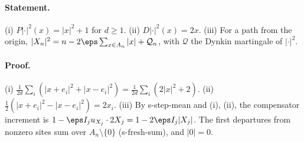 \paragraph{Statement.} (i) $P|\cdot|^2(x)=|x|^2+1$ for $d\geq1$. (ii) $D|\cdot|^2(x)=2x$. (iii) For a path from the origin,
$|X_n|^2=n-2\eps\sum_{x\in A_n}|x|+\mathcal Q_n$, with $\mathcal Q$ the Dynkin martingale of $|\cdot|^2$.
\paragraph{Proof.} (i) $\frac1{2d}\sum_i(|x+e_i|^2+|x-e_i|^2)=\frac1{2d}\sum_i(2|x|^2+2)$. (ii) $\frac12(|x+e_i|^2-|x-e_i|^2)=2x_i$. (iii) By
s-step-mean and (i), (ii), the compensator increment is $1-\eps I_ju_{X_j}\cdot2X_j=1-2\eps I_j|X_j|$. The first departures from nonzero sites
sum over $A_n\setminus\{0\}$ (s-fresh-sum), and $|0|=0$.

